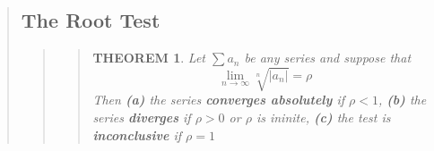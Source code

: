 \documentclass{report}
\newtheorem{theorem}{THEOREM}
\begin{document}
\begin{quote}
\begin{quote}
	\end{quote}

	\subsection{The Root Test}
	\begin{quote}

		\begin{quote}
			\begin{theorem}

				Let $\sum a_n$ be any series and suppose that
				$$\lim_{n \to \infty } \sqrt[n]{\left | a_n \right |} = \rho$$
				Then \textbf{(a)} the series \textbf{converges absolutely} if $\rho < 1$, \textbf{(b)} the series \textbf{diverges} if $ \rho > 0 $ or $\rho$ is ininite, \textbf{(c)} the test is \textbf{inconclusive} if $\rho = 1$
			
			\end{theorem}
		\end{quote}

	\end{quote}

\end{quote}

\end{document}
